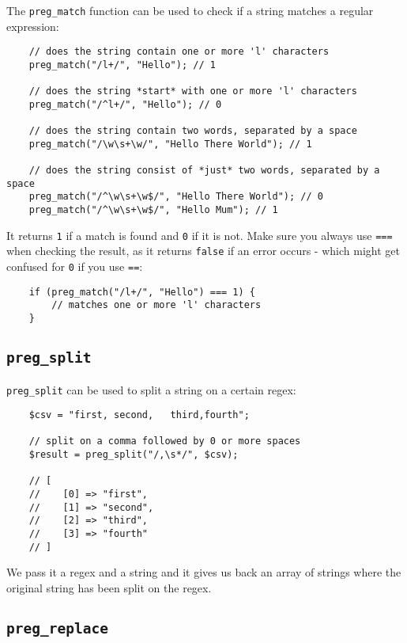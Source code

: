 The \texttt{preg\_match} function can be used to check if a string matches a regular expression:

\begin{verbatim}
    // does the string contain one or more 'l' characters
    preg_match("/l+/", "Hello"); // 1

    // does the string *start* with one or more 'l' characters
    preg_match("/^l+/", "Hello"); // 0

    // does the string contain two words, separated by a space
    preg_match("/\w\s+\w/", "Hello There World"); // 1

    // does the string consist of *just* two words, separated by a space
    preg_match("/^\w\s+\w$/", "Hello There World"); // 0
    preg_match("/^\w\s+\w$/", "Hello Mum"); // 1
\end{verbatim}

It returns \texttt{1} if a match is found and \texttt{0} if it is not. Make sure you always use \texttt{===} when checking the result, as it returns \texttt{false} if an error occurs - which might get confused for \texttt{0} if you use \texttt{==}:

\begin{verbatim}
    if (preg_match("/l+/", "Hello") === 1) {
        // matches one or more 'l' characters
    }
\end{verbatim}


\subsection{\texttt{preg\_split}}

\texttt{preg\_split} can be used to split a string on a certain regex:

\begin{verbatim}
    $csv = "first, second,   third,fourth";

    // split on a comma followed by 0 or more spaces
    $result = preg_split("/,\s*/", $csv);

    // [
    //    [0] => "first",
    //    [1] => "second",
    //    [2] => "third",
    //    [3] => "fourth"
    // ]
\end{verbatim}

We pass it a regex and a string and it gives us back an array of strings where the original string has been split on the regex.

\subsection{\texttt{preg\_replace}}

